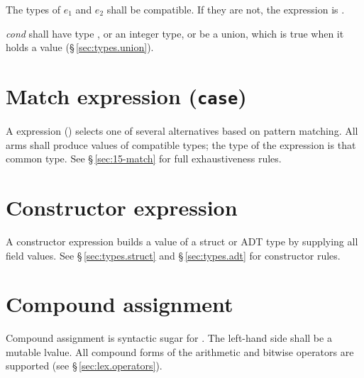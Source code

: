 \begin{constraint}
  The types of $e_1$ and $e_2$ shall be compatible.  If they are not, the
  expression is \illformed{}.
\end{constraint}

\begin{constraint}
  \textit{cond} shall have type , or an integer type, or be a union, which is
  true when it holds a value (\S\,\ref{sec:types.union}).
\end{constraint}

\section{Match expression (\texttt{case})}
\label{sec:expr.match}

\pnum
A  expression () selects one of
several alternatives based on pattern matching.  All arms shall produce
values of compatible types; the type of the  expression is that
common type.  See \S\,\ref{sec:15-match} for full exhaustiveness rules.

\section{Constructor expression}
\label{sec:expr.constructor}

\pnum
A constructor expression builds a value of a struct or ADT type by
supplying all field values.  See \S\,\ref{sec:types.struct} and
\S\,\ref{sec:types.adt} for constructor rules.

\section{Compound assignment}
\label{sec:expr.compound-assign}

\pnum
Compound assignment  is syntactic sugar for
.  The left-hand side shall be a mutable lvalue.
All compound forms of the arithmetic and bitwise operators are supported
(see \S\,\ref{sec:lex.operators}).
